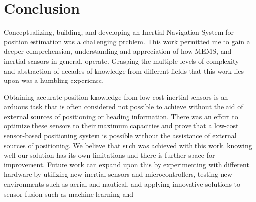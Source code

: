 \section{Conclusion}
Conceptualizing, building, and developing an Inertial Navigation System for position estimation was a challenging problem. This work permitted me to gain a deeper comprehension, understanding and appreciation of how MEMS, and inertial sensors in general, operate. Grasping the multiple levels of complexity and abstraction of decades of knowledge from different fields that this work lies upon was a humbling experience.

Obtaining accurate position knowledge from low-cost inertial sensors is an arduous task that is often considered not possible to achieve without the aid of external sources of positioning or heading information. There was an effort to optimize these sensors to their maximum capacities and prove that a low-cost sensor-based positioning system is possible without the assistance of external sources of positioning. We believe that such was achieved with this work, knowing well our solution has its own limitations and there is further space for improvement. Future work can expand upon this by experimenting with different hardware by utilizing new inertial sensors and microcontrollers, testing new environments such as aerial and nautical, and applying innovative solutions to sensor fusion such as machine learning and